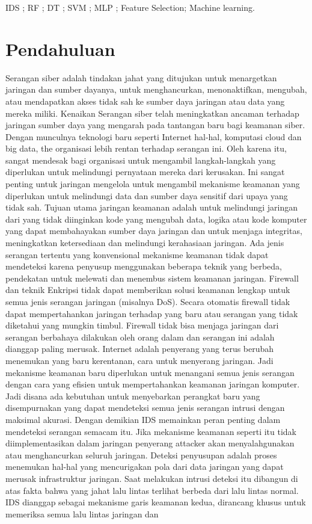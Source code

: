 \documentclass[conference]{IEEEtran}
\begin{document}
\begin{IEEEkeywords}
IDS ; RF ; DT ; SVM ; MLP ; Feature Selection; Machine learning.
\end{IEEEkeywords}

\section{Pendahuluan}
Serangan siber adalah tindakan jahat yang ditujukan untuk menargetkan jaringan dan sumber dayanya, untuk menghancurkan, menonaktifkan, mengubah, atau mendapatkan akses tidak sah ke sumber daya jaringan atau data yang mereka miliki\cite{bechhofer2009owl}. Kenaikan Serangan siber telah meningkatkan ancaman terhadap jaringan sumber daya yang mengarah pada tantangan baru bagi keamanan siber. Dengan munculnya teknologi baru seperti Internet hal-hal, komputasi cloud dan big data, the organisasi lebih rentan terhadap serangan ini. Oleh karena itu, sangat mendesak bagi organisasi untuk mengambil langkah-langkah yang diperlukan untuk melindungi pernyataan mereka dari kerusakan\cite{masoodi2019security}. Ini sangat penting untuk jaringan mengelola untuk mengambil mekanisme keamanan yang diperlukan untuk melindungi data dan sumber daya sensitif dari upaya yang tidak sah. Tujuan utama jaringan keamanan adalah untuk melindungi jaringan dari yang tidak diinginkan kode yang mengubah data, logika atau kode komputer yang dapat membahayakan sumber daya jaringan dan untuk menjaga integritas, meningkatkan ketersediaan dan melindungi kerahasiaan jaringan. Ada jenis serangan tertentu yang konvensional mekanisme keamanan tidak dapat mendeteksi karena penyusup menggunakan beberapa teknik yang berbeda, pendekatan untuk melewati dan menembus sistem keamanan jaringan. Firewall dan teknik Enkripsi tidak dapat memberikan solusi keamanan lengkap untuk semua jenis serangan jaringan (misalnya DoS). Secara otomatis firewall tidak dapat mempertahankan jaringan terhadap yang baru atau serangan yang tidak diketahui yang mungkin timbul. Firewall tidak bisa menjaga jaringan dari serangan berbahaya dilakukan oleh orang dalam dan serangan ini adalah dianggap paling merusak\cite{bamhdi2021ensemble}. Internet adalah penyerang yang terus berubah menemukan yang baru kerentanan, cara untuk menyerang jaringan. Jadi mekanisme keamanan baru diperlukan untuk menangani semua jenis serangan dengan cara yang efisien untuk mempertahankan keamanan jaringan komputer. Jadi disana ada kebutuhan untuk menyebarkan perangkat baru yang disempurnakan yang dapat mendeteksi semua jenis serangan intrusi dengan maksimal akurasi\cite{yang2015evaluating}. Dengan demikian IDS memainkan peran penting dalam mendeteksi serangan semacam itu. Jika mekanisme keamanan seperti itu tidak diimplementasikan dalam jaringan penyerang attacker akan menyalahgunakan atau menghancurkan seluruh jaringan. Deteksi penyusupan adalah proses menemukan hal-hal yang mencurigakan pola dari data jaringan yang dapat merusak infrastruktur jaringan\cite{sain1996nature}. Saat melakukan intrusi deteksi itu dibangun di atas fakta bahwa yang jahat lalu lintas terlihat berbeda dari lalu lintas normal. IDS dianggap sebagai mekanisme garis keamanan kedua, dirancang khusus untuk memeriksa semua lalu lintas jaringan dan 
\end{document}

